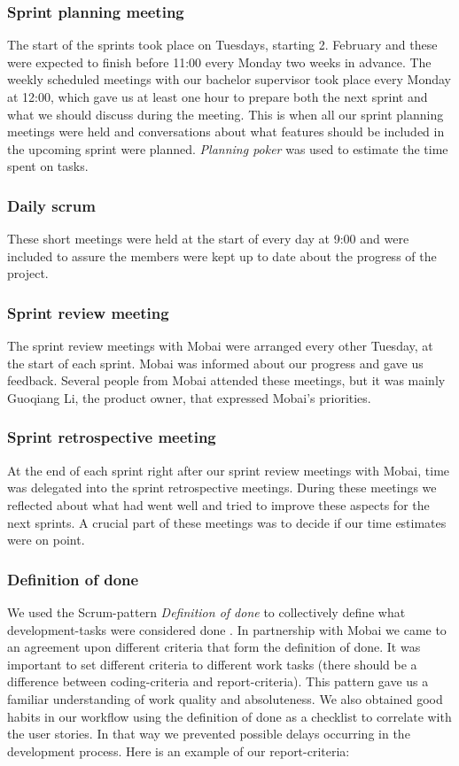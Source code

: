 \subsubsection*{Sprint planning meeting}
The start of the sprints took place on Tuesdays, starting 2. February and these were expected to finish before 11:00 every Monday two weeks in advance. The weekly scheduled meetings with our bachelor supervisor took place every Monday at 12:00, which gave us at least one hour to prepare both the next sprint and what we should discuss during the meeting. This is when all our sprint planning meetings were held and conversations about what features should be included in the upcoming sprint were planned. \textit{Planning poker} was used to estimate the time spent on tasks.

\subsubsection*{Daily scrum}
These short meetings were held at the start of every day at 9:00 and were included to assure the members were kept up to date about the progress of the project.

\subsubsection*{Sprint review meeting}
The sprint review meetings with Mobai were arranged every other Tuesday, at the start of each sprint. Mobai was informed about our progress and gave us feedback. Several people from Mobai attended these meetings, but it was mainly Guoqiang Li, the product owner, that expressed Mobai's priorities. 

\subsubsection*{Sprint retrospective meeting}
At the end of each sprint right after our sprint review meetings with Mobai, time was delegated into the sprint retrospective meetings. During these meetings we reflected about what had went well and tried to improve these aspects for the next sprints. A crucial part of these meetings was to decide if our time estimates were on point. 

\subsubsection{Definition of done}
We used the Scrum-pattern \textit{Definition of done} to collectively define what development-tasks were considered done \cite{DoneDone}. In partnership with Mobai we came to an agreement upon different criteria that form the definition of done. It was important to set different criteria to different work tasks (there should be a difference between coding-criteria and report-criteria). This pattern gave us a familiar understanding of work quality and absoluteness. We also obtained good habits in our workflow using the definition of done as a checklist to correlate with the user stories. In that way we prevented possible delays occurring in the development process. Here is an example of our report-criteria: 

